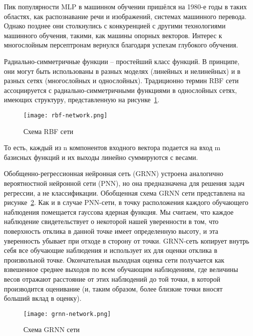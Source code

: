 Пик популярности MLP в машинном обучении пришёлся на 1980-е годы в таких областях, как распознавание речи и
изображений, системах машинного перевода. Однако позднее они столкнулись с конкуренцией с другими технологиями
машинного обучения, такими, как машины опорных векторов. Интерес к многослойным персептронам вернулся благодаря
успехам глубокого обучения.

Радиально-симметричные функции – простейший класс функций. \linebreak В принципе, они могут быть использованы в разных моделях
(линейных и нелинейных) и в разных сетях (многослойных и однослойных). Традиционно термин RBF сети ассоциируется с
радиально-симметричными функциями в однослойных сетях, имеющих структуру, представленную на рисунке~\ref{fig:analogues:rbf-network}.

\begin{figure}[!ht]
  \centering
  \texttt{[image: rbf-network.png]} 
  \caption{Схема RBF сети}
  \label{fig:analogues:rbf-network}
\end{figure}

То есть, каждый из n компонентов входного вектора подается на вход m базисных функций и их выходы линейно суммируются
с весами.

Обобщенно-регрессионная нейронная сеть (GRNN) устроена аналогично вероятностной нейронной сети (PNN), но она
предназначена для решения задач регрессии, а не классификации. Обобщенная схема GRNN сети представлена на
рисунке~\ref{fig:analogues:grnn-network}. Как и в случае PNN-сети, в точку расположения каждого
обучающего наблюдения помещается гауссова ядерная функция. Мы считаем, что каждое наблюдение свидетельствует о
некоторой нашей уверенности в том, что поверхность отклика в данной точке имеет определенную высоту, и эта
уверенность убывает при отходе в сторону от точки. GRNN-сеть копирует внутрь себя все обучающие наблюдения и
использует их для оценки отклика в произвольной точке. Окончательная выходная оценка сети получается как взвешенное
среднее выходов по всем обучающим наблюдениям, где величины весов отражают расстояние от этих наблюдений до той точки,
в которой производится оценивание (и, таким образом, более близкие точки вносят больший вклад в оценку).

\begin{figure}[!ht]
  \centering
  \texttt{[image: grnn-network.png]} 
  \caption{Схема GRNN сети}
  \label{fig:analogues:grnn-network}
\end{figure}

